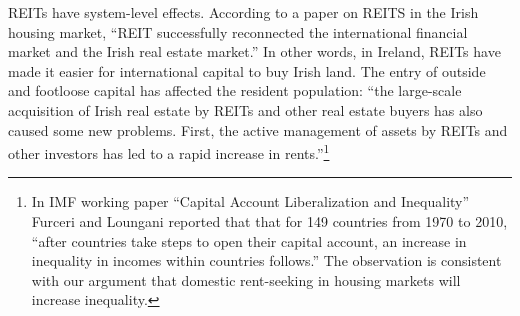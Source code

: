 



REITs have system-level effects. %
According to a paper \cite{wangAnalyzeImpactREITs2021} on REITS in the Irish housing market, ``REIT successfully reconnected the international financial market and the Irish real estate market.'' In other words, in Ireland, REITs have made it easier for international capital to buy Irish land. The entry of outside and footloose capital has affected the resident population:  ``the large-scale acquisition of Irish real estate by REITs and other real estate buyers has also caused some new problems. First, the active management of assets by REITs and other investors has led to a rapid increase in rents.''\footnote{In  IMF working paper ``Capital Account Liberalization and Inequality'' \cite{furceriCapitalAccountLiberalization2015}  Furceri and Loungani reported that that for 149 countries from 1970 to 2010, ``after countries take steps to open their capital account, an increase in inequality in incomes within countries follows.'' The observation is consistent with our argument that domestic \gls{rent-seeking} in housing markets will increase inequality.}  

